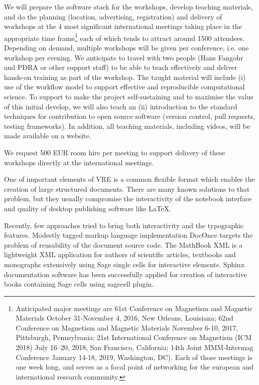 \begin{workpackage}[id=dissem,wphases=18-48!.5,
  title=Dissemination,
  SARM=1,
  USORM=10,
  USHRM=8,
  USRM=24
]
\begin{tasklist}
\begin{task}[title=\OOMMFNB{} open source dissemination workshops,
id=dissemination-of-oommf-nb-workshops]
  We will prepare the software stack for the workshops, develop
  teaching materials, and do the planning (location, advertising,
  registration) and delivery of workshops at the 4 most significant
  international meetings taking place in the appropriate time
  frame\footnote{Anticipated major meetings are 61st Conference on
    Magnetism and Magnetic Materials October 31-November 4, 2016, New
    Orleans, Louisiana; 62nd Conference on Magnetism and Magnetic
    Materials November 6-10, 2017, Pittsburgh, Pennsylvania; 21st
    International Conference on Magnetism (ICM 2018) July 16–20, 2018,
    San Francisco, California; 14th Joint MMM-Intermag Conference
    January 14-18, 2019, Washington, DC). Each of those meetings is
    one week long, and serves as a focal point of networking for the
    european and international research community.} each of which
  tends to attract around 1500 attendees. Depending on demand,
  multiple workshops will be given per conference, i.e. one workshop
  per evening. We anticipate to travel with two people (Hans Fangohr
  and PDRA or other support staff) to be able to teach effectively and
  deliver hands-on training as part of the workshop. The taught
  material will include (i) use of the \OOMMFNB{} workflow model to
  support effective and reproducible computational science.  
  To support to make the \OOMMFNB{} project self-sustaining and to
  maximise the value of this initial develop, we will also teach an
  (ii) introduction to the standard techniques for contribution to
  open source software (version control, pull requests, testing
  frameworks).  In addition, all teaching materials, including videos,
  will be made available on a website.

  We request 500 EUR room hire per meeting to support delivery of
  these workshops directly at the international meetings.
\end{task}


\begin{task}[title=Demonstrator: interactive books,
id=ibook]

One of important elements of VRE is a common flexible format which
enables the creation of large structured documents. There are many
known solutions to that problem, but they usually compromise the
interactivity of the notebook interface and quality of desktop
publishing software like LaTeX. 

Recently, few approaches tried to bring both interactivity and the
typographic features. Modestly tagged markup language implementation
DocOnce targets the problem of reusability of the document source
code. The MathBook XML is a lightweight XML application for authors of
scientific articles, textbooks and monographs extensively using Sage
single cells for interactive elements. Sphinx documentation software
has been successfully applied for creation of interactive books
containing Sage cells using sagecell plugin. 


\end{task}
\end{tasklist}
\end{workpackage}
